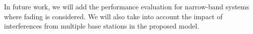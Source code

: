 

In future work, we will add the performance evaluation for narrow-band systems where fading is considered. We will also take into account the impact of  interferences from multiple base stations in the proposed model.